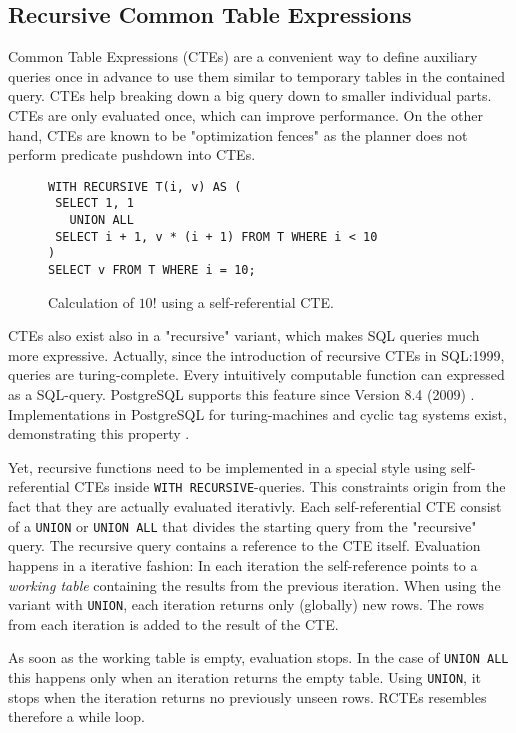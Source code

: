 \subsection{Recursive Common Table Expressions}

Common Table Expressions (CTEs) are a convenient way to define auxiliary queries once in advance to use them similar to temporary tables in the contained query. CTEs help breaking down a big query down to smaller individual parts. CTEs are only evaluated once, which can improve performance. On the other hand, CTEs are known to be "optimization fences" as the planner does not perform predicate pushdown into CTEs.


\begin{figure}[h!]
    \centering
    \begin{verbatim}
WITH RECURSIVE T(i, v) AS (
 SELECT 1, 1
   UNION ALL
 SELECT i + 1, v * (i + 1) FROM T WHERE i < 10
)
SELECT v FROM T WHERE i = 10;
    \end{verbatim}
    \caption{Calculation of $10!$ using a self-referential CTE.}
    \label{fig:my_label}
\end{figure}


CTEs also exist also in a "recursive" variant, which makes SQL queries much more expressive. Actually, since the introduction of recursive CTEs in SQL:1999, queries are turing-complete. Every intuitively computable function can expressed as a SQL-query. PostgreSQL supports this feature since Version 8.4 (2009) \cite[p. 2811]{psql}. Implementations in PostgreSQL for turing-machines and cyclic tag systems exist, demonstrating this property \cite{psqlWikiCTS, psqlWikiTM}.

Yet, recursive functions need to be implemented in a special style using self-referential CTEs inside \texttt{WITH RECURSIVE}-queries. This constraints origin from the fact that they are actually evaluated iterativly. Each self-referential CTE consist of a \texttt{UNION} or \texttt{UNION ALL} that divides the starting query from the "recursive" query. The recursive query contains a reference to the CTE itself. Evaluation happens in a iterative fashion: In each iteration the self-reference points to a \textit{working table} containing the results from the previous iteration. When using the variant with \texttt{UNION}, each iteration returns only (globally) new rows. The rows from each iteration is added to the result of the CTE.

As soon as the working table is empty, evaluation stops. In the case of \texttt{UNION ALL} this happens only when an iteration returns the empty table. Using \texttt{UNION}, it stops when the iteration returns no previously unseen rows. RCTEs resembles therefore a while loop.


